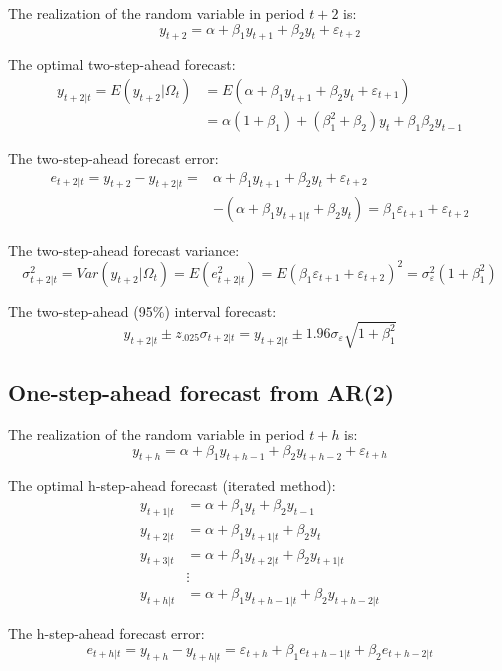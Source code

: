 \documentclass[
  12pt,
  oneside]{book}
\begin{document}
The realization of the random variable in period \(t+2\) is: \[y_{t+2} = \alpha + \beta_1 y_{t+1} + \beta_2 y_{t} + \varepsilon_{t+2}\]

The optimal two-step-ahead forecast:
\[\begin{aligned}
y_{t+2|t} = E(y_{t+2}|\Omega_t) &= E(\alpha + \beta_1 y_{t+1} + \beta_2 y_{t} + \varepsilon_{t+1}) \\
&= \alpha(1+\beta_1) + (\beta_1^2+\beta_2) y_{t} + \beta_1\beta_2 y_{t-1}
\end{aligned}\]

The two-step-ahead forecast error:
\[\begin{aligned}
e_{t+2|t} = y_{t+2} - y_{t+2|t} =& \alpha + \beta_1 y_{t+1} + \beta_2 y_{t} + \varepsilon_{t+2} \\
&- (\alpha + \beta_1 y_{t+1|t} + \beta_2 y_{t}) = \beta_1\varepsilon_{t+1} + \varepsilon_{t+2}
\end{aligned}\]

The two-step-ahead forecast variance:
\[\sigma_{t+2|t}^2 = Var(y_{t+2}|\Omega_t) = E(e_{t+2|t}^2) = E(\beta_1\varepsilon_{t+1} + \varepsilon_{t+2})^2 = \sigma_{\varepsilon}^2(1+\beta_1^2)\]

The two-step-ahead (95\%) interval forecast: \[y_{t+2|t} \pm z_{.025}\sigma_{t+2|t} = y_{t+2|t} \pm 1.96\sigma_{\varepsilon}\sqrt{1+\beta_1^2}\]

\hypertarget{one-step-ahead-forecast-from-ar2-1}{%
\subsection{One-step-ahead forecast from AR(2)}\label{one-step-ahead-forecast-from-ar2-1}}

The realization of the random variable in period \(t+h\) is: \[y_{t+h} = \alpha + \beta_1 y_{t+h-1} + \beta_2 y_{t+h-2} + \varepsilon_{t+h}\]

The optimal h-step-ahead forecast (iterated method):
\[\begin{aligned}
y_{t+1|t} &= \alpha + \beta_1 y_t + \beta_2 y_{t-1} \\
y_{t+2|t} &= \alpha + \beta_1 y_{t+1|t} + \beta_2 y_{t} \\
y_{t+3|t} &= \alpha + \beta_1 y_{t+2|t} + \beta_2 y_{t+1|t} \\
&\vdots \\
y_{t+h|t} &= \alpha + \beta_1 y_{t+h-1|t} + \beta_2 y_{t+h-2|t}
\end{aligned}\]

The h-step-ahead forecast error: \[e_{t+h|t} = y_{t+h} - y_{t+h|t} = \varepsilon_{t+h}+\beta_1 e_{t+h-1|t}+\beta_2 e_{t+h-2|t}\]
\end{document}
